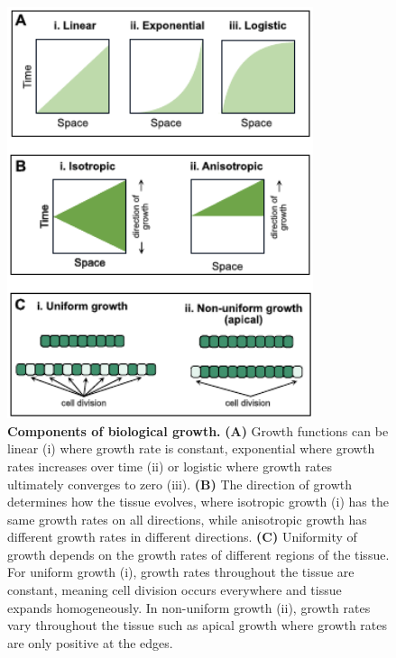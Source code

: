 


\begin{figure}[h!]
    \centering
    \includegraphics[width=0.8\textwidth]{chapters/Introduction/growth}
    \caption{\textbf{Components of biological growth.} \textbf{(A)} Growth functions can be linear (i) where growth rate is constant, exponential where growth rates increases over time (ii) or logistic where growth rates ultimately converges to zero (iii). \textbf{(B)} The direction of growth determines how the tissue evolves, where isotropic growth (i) has the same growth rates on all directions, while anisotropic growth has different growth rates in different directions. \textbf{(C)} Uniformity of growth depends on the growth rates of different regions of the tissue. For uniform growth (i), growth rates throughout the tissue are constant, meaning cell division occurs everywhere and tissue expands homogeneously. In non-uniform growth (ii), growth rates vary throughout the tissue such as apical growth where growth rates are only positive at the edges.}
    \label{fig:growth}
\end{figure}



